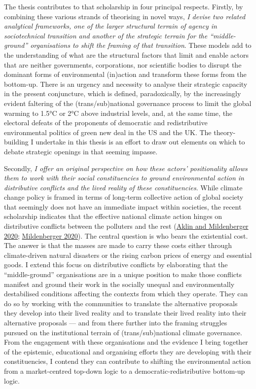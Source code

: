 \documentclass[a4paper, nobind]{templates/ociamthesis}
\begin{document}
The thesis contributes to that scholarship in four principal respects. Firstly, by combining these various strands of theorising in novel ways, \emph{I devise two related analytical frameworks, one of the larger structural terrain of agency in sociotechnical transition and another of the strategic terrain for the ``middle-ground'' organisations to shift the framing of that transition}. These models add to the understanding of what are the structural factors that limit and enable actors that are neither governments, corporations, nor scientific bodies to disrupt the dominant forms of environmental (in)action and transform these forms from the bottom-up. There is an urgency and necessity to analyse their strategic capacity in the present conjuncture, which is defined, paradoxically, by the increasingly evident faltering of the (trans/sub)national governance process to limit the global warming to 1.5°C or 2°C above industrial levels, and, at the same time, the electoral defeats of the proponents of democratic and redistributive environmental politics of green new deal in the US and the UK. The theory-building I undertake in this thesis is an effort to draw out elements on which to debate strategic openings in that seeming impasse.

Secondly, \emph{I offer an original perspective on how these actors' positionality allows them to work with their social constituencies to ground environmental action in distributive conflicts and the lived reality of these constituencies}. While climate change policy is framed in terms of long-term collective action of global society that seemingly does not have an immediate impact within societies, the recent scholarship indicates that the effective national climate action hinges on distributive conflicts between the polluters and the rest (\protect\hyperlink{ref-aklin_prisoners_2020}{Aklin and Mildenberger 2020}; \protect\hyperlink{ref-mildenberger_carbon_2020}{Mildenberger 2020}). The central question is who bears the existential cost. The answer is that the masses are made to carry these costs either through climate-driven natural disasters or the rising carbon prices of energy and essential goods. I extend this focus on distributive conflicts by elaborating that the ``middle-ground'' organisations are in a unique position to make those conflicts manifest and ground their work in the socially unequal and environmentally destabilised conditions affecting the contexts from which they operate. They can do so by working with the communities to translate the alternative proposals they develop into their lived reality and to translate their lived reality into their alternative proposals --- and from there further into the framing struggles pursued on the institutional terrain of (trans/sub)national climate governance. From the engagement with these organisations and the evidence I bring together of the epistemic, educational and organising efforts they are developing with their constituencies, I contend they can contribute to shifting the environmental action from a market-centred top-down logic to a democratic-redistributive bottom-up logic.
\end{document}
